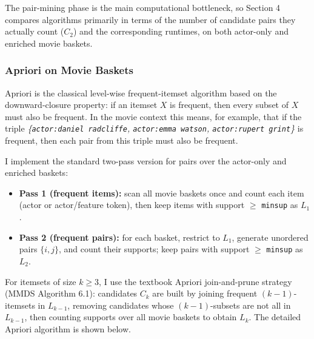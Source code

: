 \documentclass{article}  %
\begin{document}
The pair-mining phase is the main computational bottleneck, so Section 4 compares algorithms primarily in terms of the number of candidate pairs they actually count (\(C_2\)) and the corresponding runtimes, on both actor-only and enriched movie baskets.

\subsubsection{Apriori on Movie Baskets}

Apriori is the classical level-wise frequent-itemset algorithm based on the downward-closure property: if an itemset \(X\) is frequent, then every subset of \(X\) must also be frequent. In the movie context this means, for example, that if the triple \textit{\{\texttt{actor:daniel radcliffe}, \texttt{actor:emma watson}, \texttt{actor:rupert grint}\}} is frequent, then each pair from this triple must also be frequent.

I implement the standard two-pass version for pairs over the actor-only and enriched baskets:
\begin{itemize}
\item \textbf{Pass 1 (frequent items):} scan all movie baskets once and count each item (actor or actor/feature token), then keep items with support \(\ge\) \verb|minsup| as \(L_1\).
\item \textbf{Pass 2 (frequent pairs):} for each basket, restrict to \(L_1\), generate unordered pairs \(\{i,j\}\), and count their supports; keep pairs with support \(\ge\) \verb|minsup| as \(L_2\).
\end{itemize}

For itemsets of size \(k \ge 3\), I use the textbook Apriori join-and-prune strategy (MMDS Algorithm 6.1): candidates \(C_k\) are built by joining frequent \((k-1)\)-itemsets in \(L_{k-1}\), removing candidates whose \((k-1)\)-subsets are not all in \(L_{k-1}\), then counting supports over all movie baskets to obtain \(L_k\). The detailed Apriori algorithm is shown below.
\end{document}
